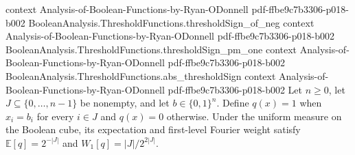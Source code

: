 \begin{theorem}
  {context}
  {Analysis-of-Boolean-Functions-by-Ryan-ODonnell}
  {pdf-ffbe9c7b3306-p018-b002}
\proofstep
  {BooleanAnalysis.ThresholdFunctions.thresholdSign_of_neg}
  {context}
  {Analysis-of-Boolean-Functions-by-Ryan-ODonnell}
  {pdf-ffbe9c7b3306-p018-b002}
\proofstep
  {BooleanAnalysis.ThresholdFunctions.thresholdSign_pm_one}
  {context}
  {Analysis-of-Boolean-Functions-by-Ryan-ODonnell}
  {pdf-ffbe9c7b3306-p018-b002}
\proofstep
  {BooleanAnalysis.ThresholdFunctions.abs_thresholdSign}
  {context}
  {Analysis-of-Boolean-Functions-by-Ryan-ODonnell}
  {pdf-ffbe9c7b3306-p018-b002}
Let $n\ge 0$, let $J\subseteq\{0,\ldots,n-1\}$ be nonempty, and let $b\in\{0,1\}^n$.
Define $q(x)=1$ when $x_i=b_i$ for every $i\in J$ and $q(x)=0$ otherwise. Under the
uniform measure on the Boolean cube, its expectation and first-level Fourier weight
satisfy $\mathbb E[q]=2^{-|J|}$ and $W_1[q]=|J|/2^{2|J|}$.
\end{theorem}

